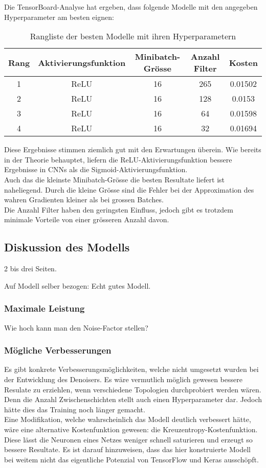Die TensorBoard-Analyse hat ergeben, dass folgende Modelle mit den angegeben
Hyperparameter am besten eignen:
\para{}
\begin{table}[h!]
  \centering
  \begin{tabular}{ |c|c|c|c|c| }
    \hline
    Rang & Aktivierungsfunktion & Minibatch-Grösse & Anzahl Filter & Kosten \\
    \hline
    1 & ReLU & 16 & 265 & 0.01502 \\
    2 & ReLU & 16 & 128 & 0.0153 \\
    3 & ReLU & 16 & 64 & 0.01598 \\
    4 & ReLU & 16 & 32 & 0.01694 \\
    \hline
  \end{tabular}
  \caption{Rangliste der besten Modelle mit ihren Hyperparametern}
\end{table}
\para{}
Diese Ergebnisse stimmen ziemlich gut mit den Erwartungen überein. Wie bereits
in der Theorie behauptet, liefern die ReLU-Aktivierungsfunktion bessere Ergebnisse
in CNNs als die Sigmoid-Aktivierungsfunktion. \\
Auch das die kleinste Minibatch-Grösse die besten Resultate liefert ist
naheliegend. Durch die kleine Grösse sind die Fehler bei der Approximation des
wahren Gradienten kleiner als bei grossen Batches. \\
Die Anzahl Filter haben den geringsten Einfluss, jedoch gibt es trotzdem
minimale Vorteile von einer grösseren Anzahl davon.


\subsection{Diskussion des Modells}
2 bis drei Seiten.


Auf Modell selber bezogen:
Echt gutes Modell.
\subsubsection{Maximale Leistung}
Wie hoch kann man den Noise-Factor stellen?

\subsubsection{Mögliche Verbesserungen}
Es gibt konkrete Verbesserungsmöglichkeiten, welche nicht umgesetzt wurden bei
der Entwicklung des Denoisers. Es wäre vermutlich möglich gewesen bessere
Resulate zu erziehlen, wenn verschiedene Topologien durchprobiert werden wären.
Denn die Anzahl Zwischenschichten stellt auch einen Hyperparameter dar. Jedoch
hätte dies das Training noch länger gemacht. \\
Eine Modifikation, welche wahrscheinlich das Modell deutlich verbessert hätte,
wäre eine alternative Kostenfunktion gewesen: die Kreuzentropy-Kostenfunktion.
Diese lässt die Neuronen eines Netzes weniger schnell saturieren und erzeugt so
bessere Resultate.
\para{}
Es ist darauf hinzuweisen, dass das hier konstruierte Modell bei weitem nicht
das eigentliche Potenzial von TensorFlow und Keras ausschöpft.


